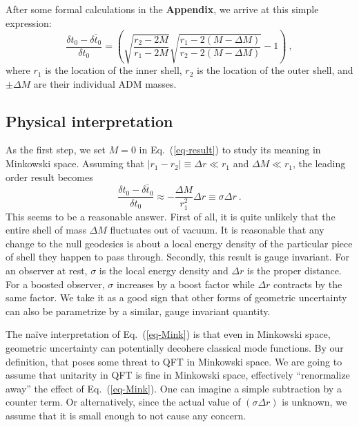 \documentclass[aps,showpacs,twocolumn,floats,prd,superscriptaddress,nofootinbib]{revtex4-1}
\begin{document}
After some formal calculations in the {\bf Appendix}, we arrive at this simple expression:
\begin{equation}
\frac{\delta t_0 - \bar{\delta t_0}}{\delta t_0} = 
\left(\sqrt{\frac{r_2-2M}{r_1-2M}}\sqrt{\frac{r_1-2(M-\Delta M)}{r_2-2(M-\Delta M)}}-1\right)~,
\label{eq-result}
\end{equation}
where $r_1$ is the location of the inner shell, $r_2$ is the location of the outer shell, and $\pm\Delta M$ are their individual ADM masses.

\subsection{Physical interpretation}

As the first step, we set $M=0$ in Eq.~(\ref{eq-result}) to study its meaning in Minkowski space. Assuming that $|r_1-r_2| \equiv \Delta r \ll r_1$ and $\Delta M \ll r_1$, the leading order result becomes
\begin{equation}
\frac{\delta t_0 - \bar{\delta t_0}}{\delta t_0} \approx - \frac{\Delta M}{r_1^2} \Delta r 
\equiv \sigma \Delta r~.	
\label{eq-Mink}
\end{equation}
This seems to be a reasonable answer. 
First of all, it is quite unlikely that the entire shell of mass $\Delta M$ fluctuates out of vacuum.
It is reasonable that any change to the null geodesics is about a local energy density of the particular piece of shell they happen to pass through.
Secondly, this result is gauge invariant. For an observer at rest, $\sigma$ is the local energy density and $\Delta r$ is the proper distance. 
For a boosted observer, $\sigma$ increases by a boost factor while $\Delta r$ contracts by the same factor.
We take it as a good sign that other forms of geometric uncertainty can also be parametrize by a similar, gauge invariant quantity.

The na\"ive interpretation of Eq.~(\ref{eq-Mink}) is that even in Minkowski space, geometric uncertainty can potentially decohere classical mode functions.
By our definition, that poses some threat to QFT in Minkowski space.
We are going to assume that unitarity in QFT is fine in Minkowski space, effectively ``renormalize away'' the effect of Eq.~(\ref{eq-Mink}).
One can imagine a simple subtraction by a counter term.
Or alternatively, since the actual value of $(\sigma\Delta r)$ is unknown, we assume that it is small enough to not cause any concern.
\end{document}
